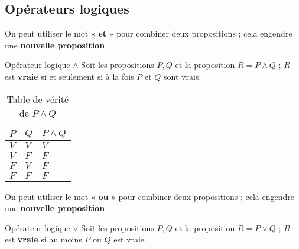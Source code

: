 \documentclass[16pt]{report}
\begin{document}
\begin{multicols*}{2}
        \section{Opérateurs logiques}
                On peut utiliser le mot « \textbf{et} » pour combiner deux propositions ; cela engendre une 
                \textbf{nouvelle proposition}. 
                \begin{Syntaxe}{Opérateur logique $\land$ }{}
                   Soit les propositions $P, Q$ et la proposition $R = P \land Q$ ; $R$ est \textbf{vraie} si 
                   et seulement si à la fois $P$ et $Q$ sont vrais. 
                \end{Syntaxe}
                
                
                \begin{table}[H]
                  \caption {Table de vérité de $P \land Q$}
                  \begin{center}
                   \renewcommand{\arraystretch}{1.5}
                   \selectfont
                    \normalsize
                        \begin{tabular}{|l|l||l|}
                        \arrayrulecolor{blue}\hline
                        \rowcolor{lightBlue}
                        \textcolor{myb}{$P$} & \textcolor{myb}{$Q$} & \textcolor{myb}{$P \land Q$}   
                        \\
                        \hline
                        \hline
                        \arrayrulecolor{black}
                        $V$ & $V$ & \cellcolor{myg} $V$
                        \\
                        \hline
                        $V$ & $F$ & \cellcolor{myr} $F$ 
                        \\
                        \hline
                        $F$ & $V$ & \cellcolor{myr} $F$ 
                        \\
                        \hline 
                        $F$ & $F$ & \cellcolor{myr} $F$ 
                        \\ 
                        \hline
                        \end{tabular}
                \end{center}
                \end{table}


                On peut utiliser le mot « \textbf{ou} » pour combiner deux propositions ; cela engendre une 
                \textbf{nouvelle proposition}. 
                \begin{Syntaxe}{Opérateur logique $\lor$ }{}
                   Soit les propositions $P, Q$ et la proposition $R = P \lor Q$ ; $R$ est \textbf{vraie} si 
                   au moins $P$ ou $Q$ est vraie. 
                \end{Syntaxe}


\end{multicols*}
\end{document}
